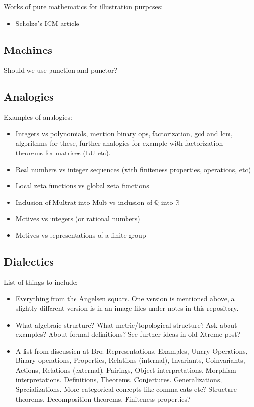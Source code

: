 Works of pure mathematics for illustration purposes:
\begin{itemize}
\item Scholze's ICM article

\end{itemize}

\subsection{Machines}

Should we use punction and punctor?

\subsection{Analogies}

Examples of analogies:


\begin{itemize}
\item Integers vs polynomials, mention binary ops, factorization, gcd and lcm, algorithms for these, further analogies for example with factorization theorems for matrices (LU etc).
\item Real numbers vs integer sequences (with finiteness properties, operations, etc)
\item Local zeta functions vs global zeta functions
\item Inclusion of Multrat into Mult vs inclusion of $\mathbb{Q}$ into $\mathbb{R}$
\item Motives vs integers (or rational numbers)
\item Motives vs representations of a finite group
\end{itemize}




\subsection{Dialectics}

List of things to include:

\begin{itemize}
\item Everything from the Angelsen square. One version is mentioned above, a slightly different version is in an image files under notes in this repository.
\item What algebraic structure? What metric/topological structure? Ask about examples? About formal definitions? See further ideas in old Xtreme post?
\item A list from discussion at Bro: Representations, Examples, Unary Operations, Binary operations, Properties, Relations (internal), Invariants, Coinvariants, Actions, Relations (external), Pairings, Object interpretations, Morphism interpretations. Definitions, Theorems, Conjectures. Generalizations, Specializations. More categorical concepts like comma cats etc? Structure theorems, Decomposition theorems, Finiteness properties?
\end{itemize}

